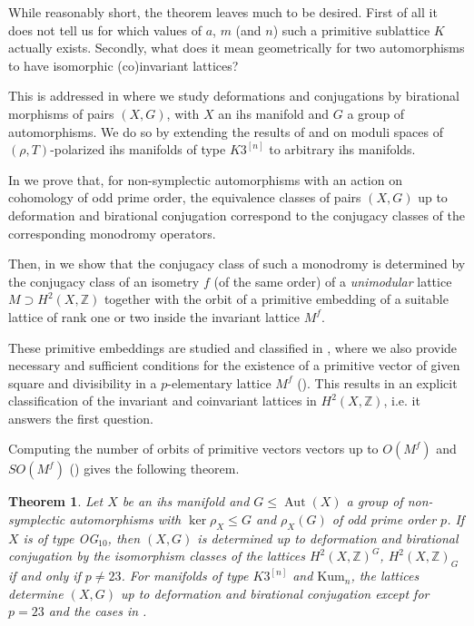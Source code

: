 \documentclass{amsart}
\theoremstyle{definition}
\theoremstyle{plain}
\newtheorem{theorem}[definition]{Theorem}
\DeclareMathOperator{\Aut}{Aut}
\newcommand{\ZZ}{\mathbb{Z}}
\newcommand{\kumn}{\mathrm{Kum}_n}
\newcommand{\hskn}{K3^{\left[n\right]}}
\begin{document}
While reasonably short, the theorem leaves much to be desired. First of all it does not tell us for which values of $a$, $m$ (and $n$) such a primitive sublattice $K$ actually exists. Secondly, what does it mean geometrically for two automorphisms to have isomorphic (co)invariant lattices?

This is addressed in  where we study deformations and conjugations by birational morphisms of pairs $(X, G)$, with $X$ an ihs manifold and $G$ a group of automorphisms. We do so by extending the results of \cite{joumaa:order2} and \cite{bcs:ball} on moduli spaces of $(\rho, T)$-polarized ihs manifolds of type $\hskn$ to arbitrary ihs manifolds.

In  we prove that, for non-symplectic automorphisms with an action on cohomology of odd prime order, the equivalence classes of pairs $(X, G)$ up to deformation and birational conjugation correspond to the conjugacy classes of the corresponding monodromy operators.

Then, in  we show that the conjugacy class of such a monodromy is determined by the conjugacy class of an isometry $f$ (of the same order) of a \emph{unimodular} lattice $M \supset H^2(X,\ZZ)$ together with the orbit of a primitive embedding of a suitable lattice of rank one or two inside the invariant lattice $M^f$.

These primitive embeddings are studied and classified in  , where we also provide necessary and sufficient conditions for the existence of a primitive vector of given square and divisibility in a $p$-elementary lattice $M^f$ ().
This results in an explicit classification of the invariant and coinvariant lattices in $H^2(X,\ZZ)$, i.e. it answers the first question.

Computing the number of orbits of primitive vectors vectors up to $O(M^f)$ and $SO(M^f)$ () gives the following theorem.
\begin{theorem}
Let $X$ be an ihs manifold and $G \leq \Aut(X)$ a group of non-symplectic automorphisms with $\ker \rho_X \leq G$ and $\rho_X(G)$ of odd prime order $p$. If $X$ is of type OG$_{10}$, then $(X,G)$ is determined up to deformation and birational conjugation by the isomorphism classes of the lattices $H^2(X,\ZZ)^G$, $H^2(X,\ZZ)_G$ if and only if $p\neq 23$. For manifolds of type $\hskn$ and $\kumn$, the lattices determine $(X,G)$ up to deformation and birational conjugation except for $p=23$ and the cases in .
\end{theorem}
\end{document}
